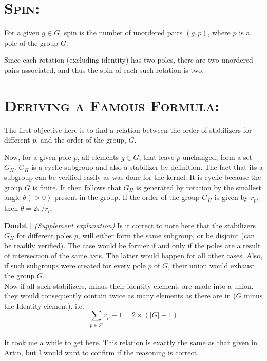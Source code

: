 \par
\section{\textsc {Spin: }}
 For a given $g \in G$, spin is the number of unordered pairs $(g,p)$, where $p$ is a pole of the group $G$.
\par
Since each rotation (excluding identity) has two poles, there are two unordered pairs associated, and thus the spin of each such rotation is two.\\
\par
\section{\textsc {Deriving a Famous Formula: }}
 The first objective here is to find a relation between the order of stabilizers for different $p$, and the order of the group, $G$.
\par
Now, for a given pole $p$, all elements $g \in G$, that leave $p$ unchanged, form a set $G_{H}$. $G_{H}$ is a cyclic subgroup and also a stabilizer by definition. The fact that its a subgroup can be verified easily as was done for the kernel. It is cyclic because the group $G$ is finite. It then follows that $G_{H}$ is generated by rotation by the smallest angle $\theta (>0)$ present in the group. If the order of the group $G_{H}$ is given by $r_{p}$, then 
$\theta = 2 \pi/r_{p}$.
\par
{\bf Doubt | } \emph{(Supplement explanation)} Is it correct to note here that the stabilizers $G_{H}$ for different poles $p$, will either form the same subgroup, or be disjoint (can be readily verified). The case would be former if and only if the poles are a result of intersection of the same axis. The latter would happen for all other cases. Also, if such subgroups were created for every pole $p$ of $G$, their union would exhaust the group $G$.\\
Now if all such stabilizers, minus their identity element, are made into a union, they would consequently contain twice as many elements as there are in (${G}$ minus the Identity element).  i.e.\\
\begin{equation}
\sum\limits_{p \in \mathcal{P}} {r_{p} - 1}= 2 \times ({|G|} - 1) 
\label{eqn.orderof_stab_group}
\end{equation}\\
It took me a while to get here. This relation is exactly the same as that given in Artin, but I would want to confirm if the reasoning is correct.

